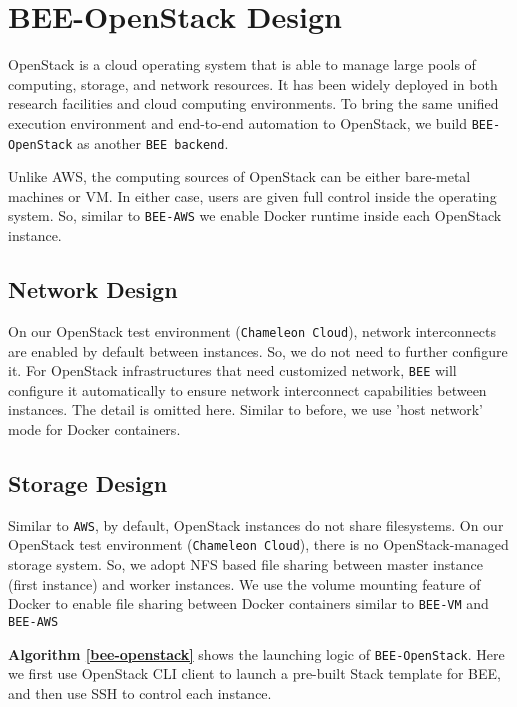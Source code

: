\section{BEE-OpenStack Design}
\label{bee-openstack-section}
OpenStack is a cloud operating system that is able to manage large pools of computing, storage, and network resources. It has been widely deployed in both research facilities and cloud computing environments. To bring the same unified execution environment and end-to-end automation to OpenStack, we build \texttt{BEE-OpenStack} as another \texttt{BEE backend}.

Unlike AWS, the computing sources of OpenStack can be either bare-metal machines or VM. In either case, users are given full control inside the operating system. So, similar to \texttt{BEE-AWS} we enable Docker runtime inside each OpenStack instance. 

\subsection{Network Design}
On our OpenStack test environment (\texttt{Chameleon Cloud}), network interconnects are enabled by default between instances. So, we do not need to further configure it. For OpenStack infrastructures that need customized network, \texttt{BEE} will configure it automatically to ensure network interconnect capabilities between instances. The detail is omitted here. Similar to before, we use 'host network' mode for Docker containers.

\subsection{Storage Design}
Similar to \texttt{AWS}, by default, OpenStack instances do not share filesystems. On our OpenStack test environment (\texttt{Chameleon Cloud}), there is no OpenStack-managed storage system. So, we adopt NFS based file sharing between master instance (first instance) and worker instances. We use the volume mounting feature of Docker to enable file sharing between Docker containers similar to \texttt{BEE-VM} and \texttt{BEE-AWS}

\textbf{Algorithm \ref{bee-openstack}} shows the launching logic of \texttt{BEE-OpenStack}. Here we first use OpenStack CLI client to launch a pre-built Stack template for BEE, and then use SSH to control each instance.

